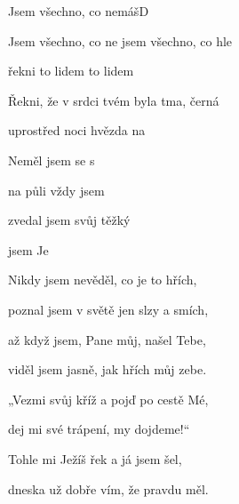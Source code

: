 \begin{song}{Jsem všechno, co nemáš}{D}{}

\begin{SBChorus}

Jsem všechno, co ne jsem všechno, co hle 

řekni to lidem   to lidem  

Řekni, že v srdci tvém byla tma, černá  

uprostřed noci   hvězda na 

\end{SBChorus}

\begin{SBVerse}

Neměl jsem  se s   

na půli  vždy  jsem  

zvedal jsem  svůj těžký 

 jsem   Je

\end{SBVerse}

\begin{SBVerse}

Nikdy jsem nevěděl, co je to hřích, 

poznal jsem v světě jen slzy a smích, 

až když jsem, Pane můj, našel Tebe, 

viděl jsem jasně, jak hřích můj zebe.

\end{SBVerse}

\begin{SBVerse}

„Vezmi svůj kříž a pojď po cestě Mé, 

dej mi své trápení, my dojdeme!“ 

Tohle mi Ježíš řek a já jsem šel, 

dneska už dobře vím, že pravdu měl.

\end{SBVerse}

\end{song}
\pagebreak

